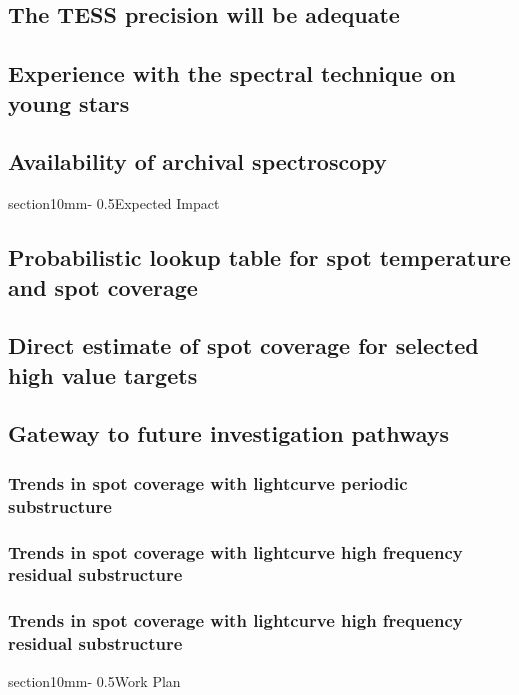 \documentclass[letterpaper,11pt]{article}
\makeatletter
\renewcommand{\section}{\@startsection%
{section}{1}{0mm}{-\baselineskip}%
{0.5\baselineskip}{\normalfont\Large\bfseries}}%
\makeatother
\begin{document}
\subsection{The TESS precision will be adequate}
\subsection{Experience with the spectral technique on young stars}
\subsection{Availability of archival spectroscopy}


\section{Expected Impact}

\subsection{Probabilistic lookup table for spot temperature and spot coverage}
\subsection{Direct estimate of spot coverage for selected high value targets}
\subsection{Gateway to future investigation pathways}
\subsubsection{Trends in spot coverage with lightcurve periodic substructure}
\subsubsection{Trends in spot coverage with lightcurve high frequency residual substructure}
\subsubsection{Trends in spot coverage with lightcurve high frequency residual substructure}


\section{Work Plan}
\end{document}
